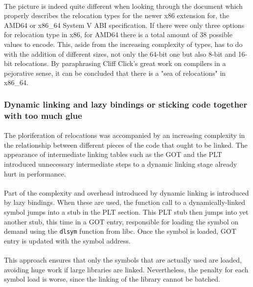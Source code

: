 \documentclass[12pt]{article}
\begin{document}
	\paragraph{}The picture is indeed quite different when looking through the document which properly describes the relocation types for the newer x86 extension for, the AMD64 or x86\_64 System V ABI specification\cite{x86_64-abi-spec}. If there were only three options for relocation type in x86, for AMD64 there is a total amount of 38 possible values to encode. This, aside from the increasing complexity of types, has to do with the addition of different sizes, not only the 64-bit one but also 8-bit and 16-bit relocations. By paraphrasing Cliff Click's great work on compilers\cite{sea-of-nodes} in a pejorative sense, it can be concluded that there is a "sea of relocations" in x86\_64.
	
	\subsubsection{Dynamic linking and lazy bindings or sticking code together with too much glue}
	
	\paragraph{}The ploriferation of relocations was accompanied by an increasing complexity in the relationship between different pieces of the code that ought to be linked. The appearance of intermediate linking tables such as the GOT and the PLT introduced unnecessary intermediate steps to a dynamic linking stage already hurt in performance.
	
	\paragraph{}Part of the complexity and overhead introduced by dynamic linking is introduced by lazy bindings\cite{lazy-bindings}. When these are used, the function call to a dynamically-linked symbol jumps into a stub in the PLT section. This PLT stub then jumps into yet another stub, this time in a GOT entry, responsible for loading the symbol on demand using the \verb|dlsym| function from libc. Once the symbol is loaded, GOT entry is updated with the symbol address.
	\paragraph{}This approach ensures that only the symbols that are actually used are loaded, avoiding huge work if large libraries are linked. Nevertheless, the penalty for each symbol load is worse, since the linking of the library cannot be batched.
\end{document}
